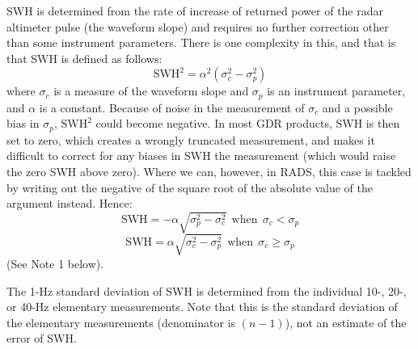 \documentclass[a4paper,11pt,openany,natbib]{thesis}
\begin{document}
SWH is determined from the rate of increase of returned power of the radar altimeter pulse (the waveform slope) and requires no further correction other than some instrument parameters. There is one complexity in this, and that is that SWH is defined as follows:
$$ \mathrm{SWH}^2 = \alpha^2 (\sigma_c^2 - \sigma_p^2) $$
where $\sigma_c$ is a measure of the waveform slope and $\sigma_p$ is an instrument parameter, and $\alpha$ is a constant. Because of noise in the measurement of $\sigma_c$ and a possible bias in $\sigma_p$, $\mathrm{SWH}^2$ could become negative. In most GDR products, SWH is then set to zero, which creates a wrongly truncated measurement, and makes it difficult to correct for any biases in SWH the measurement (which would raise the zero SWH above zero). Where we can, however, in RADS, this case is tackled by writing out the negative of the square root of the absolute value of the argument instead. Hence:
$$ \mathrm{SWH} = - \alpha \sqrt{\sigma_p^2 - \sigma_c^2} \mathrm{~~when~~} \sigma_c < \sigma_p $$
$$ \mathrm{SWH} = \alpha \sqrt{\sigma_c^2 - \sigma_p^2} \mathrm{~~when~~} \sigma_c \ge \sigma_p $$
(See Note 1 below).

The 1-Hz standard deviation of SWH is determined from the individual 10-, 20-, or 40-Hz elementary measurements. Note that this is the standard deviation of the elementary measurements (denominator is $(n-1)$), not an estimate of the error of SWH.
\end{document}
